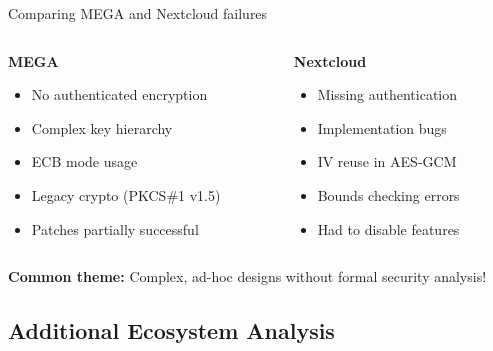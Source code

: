 \documentclass[aspectratio=169, lualatex, handout]{beamer}
\begin{document}
\begin{frame}{Comparing MEGA and Nextcloud failures}
	\begin{columns}
		\begin{column}{0.5\textwidth}
			\textbf{MEGA}
			\vspace{0.3cm}
			\begin{itemize}
				\item No authenticated encryption
				\item Complex key hierarchy
				\item ECB mode usage
				\item Legacy crypto (PKCS\#1 v1.5)
				\item Patches partially successful
			\end{itemize}
		\end{column}
		\begin{column}{0.5\textwidth}
			\textbf{Nextcloud}
			\vspace{0.3cm}
			\begin{itemize}
				\item Missing authentication
				\item Implementation bugs
				\item IV reuse in AES-GCM
				\item Bounds checking errors
				\item Had to disable features
			\end{itemize}
		\end{column}
	\end{columns}
	\vspace{0.5cm}
	\begin{center}
		\textbf{Common theme:} Complex, ad-hoc designs without formal security analysis!
	\end{center}
\end{frame}

\subsection{Additional Ecosystem Analysis}
\end{document}
